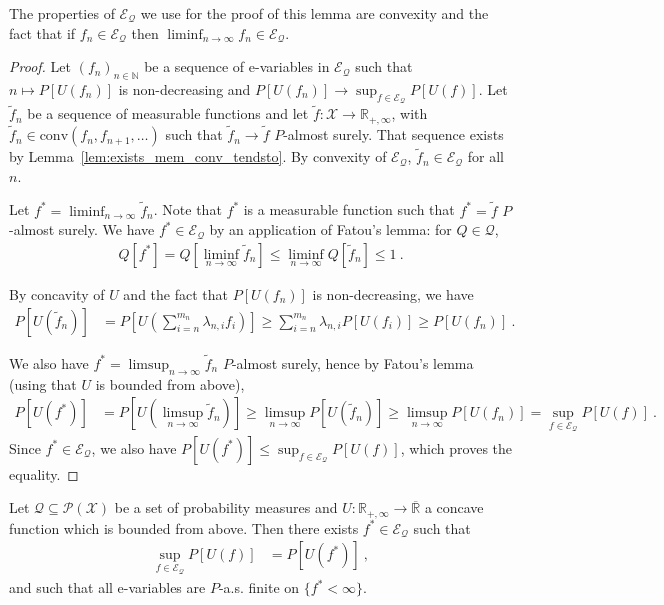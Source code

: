 The properties of $\mathcal{E}_{\mathcal{Q}}$ we use for the proof of this lemma are convexity and the fact that if $f_n \in \mathcal{E}_{\mathcal{Q}}$ then $\liminf_{n \to \infty} f_n \in \mathcal{E}_{\mathcal{Q}}$.

\begin{proof}
Let $(f_n)_{n \in \mathbb{N}}$ be a sequence of e-variables in $\mathcal{E}_{\mathcal{Q}}$ such that $n \mapsto P[U(f_n)]$ is non-decreasing and $P[U(f_n)] \to \sup_{f \in \mathcal{E}_{\mathcal{Q}}} P[U(f)]$.
Let $\tilde{f}_n$ be a sequence of measurable functions and let $\tilde{f} : \mathcal{X} \to \mathbb{R}_{+, \infty}$, with $\tilde{f}_n \in \mathrm{conv}(f_n, f_{n+1}, \ldots)$ such that $\tilde{f}_n \to \tilde{f}$ $P$-almost surely.
That sequence exists by Lemma~\ref{lem:exists_mem_conv_tendsto}.
By convexity of $\mathcal{E}_{\mathcal{Q}}$, $\tilde{f}_n \in \mathcal{E}_{\mathcal{Q}}$ for all $n$.

Let $f^* = \liminf_{n \to \infty} \tilde{f}_n$. Note that $f^*$ is a measurable function such that $f^* = \tilde{f}$ $P$-almost surely.
We have $f^* \in \mathcal{E}_{\mathcal{Q}}$ by an application of Fatou's lemma: for $Q \in \mathcal{Q}$,
\begin{align*}
  Q[f^*]
  = Q[\liminf_{n \to \infty} \tilde{f}_n]
  \le \liminf_{n \to \infty} Q[\tilde{f}_n]
  \le 1
  \: .
\end{align*}

By concavity of $U$ and the fact that $P[U(f_n)]$ is non-decreasing, we have
\begin{align*}
  P[U(\tilde{f}_n)]
  &= P[U(\sum_{i=n}^{m_n} \lambda_{n,i} f_{i})]
  \ge \sum_{i=n}^{m_n} \lambda_{n,i} P[U(f_{i})]
  \ge P[U(f_n)]
  \: .
\end{align*}

We also have $f^* = \limsup_{n \to \infty} \tilde{f}_n$ $P$-almost surely, hence by Fatou's lemma (using that $U$ is bounded from above),
\begin{align*}
  P[U(f^*)]
  &= P[U(\limsup_{n \to \infty} \tilde{f}_n)]
  \ge \limsup_{n \to \infty} P[U(\tilde{f}_n)]
  \ge \limsup_{n \to \infty} P[U(f_n)]
  = \sup_{f \in \mathcal{E}_{\mathcal{Q}}} P[U(f)]
  \: .
\end{align*}
Since $f^* \in \mathcal{E}_{\mathcal{Q}}$, we also have $P[U(f^*)] \le \sup_{f \in \mathcal{E}_{\mathcal{Q}}} P[U(f)]$, which proves the equality.
\end{proof}


\begin{lemma}\label{lem:exists_integral_utility_eq_sup_forall_lt_top}
Let $\mathcal{Q} \subseteq \mathcal{P}(\mathcal{X})$ be a set of probability measures and $U : \mathbb{R}_{+,\infty} \to \overline{\mathbb{R}}$ a concave function which is bounded from above.
Then there exists $f^* \in \mathcal{E}_{\mathcal{Q}}$ such that
\begin{align*}
  \sup_{f \in \mathcal{E}_{\mathcal{Q}}} P[U(f)]
  &= P[U(f^*)]
  \: ,
\end{align*}
and such that all e-variables are $P$-a.s. finite on $\{f^* < \infty\}$.
\end{lemma}

